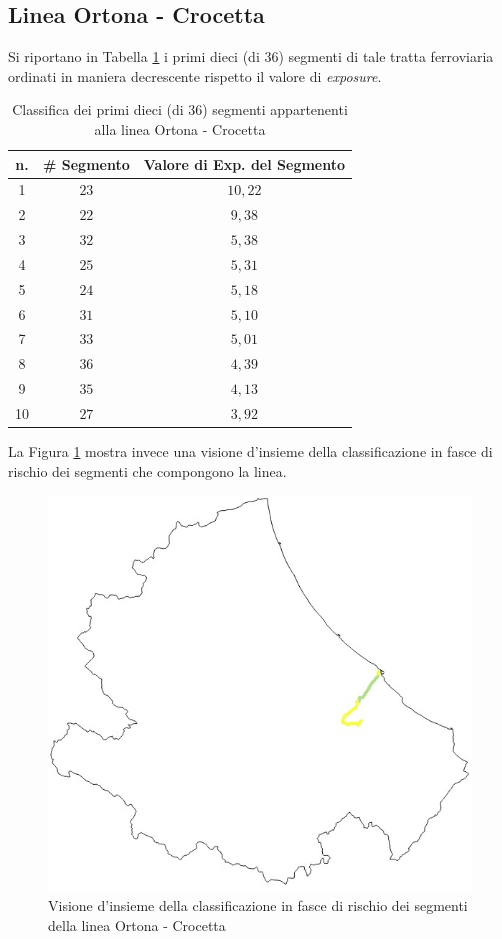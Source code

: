 \subsection{Linea Ortona - Crocetta}
Si riportano in Tabella \ref{classificaortonacrocetta} i primi dieci (di 36) segmenti di tale tratta ferroviaria ordinati in maniera decrescente rispetto il valore di \textit{exposure}.
\begin{table}[h]
\centering
\begin{tabular}{|c|c|c|}
\hline
\rowcolor{lightgray}
n. & \# Segmento & Valore di Exp. del Segmento \\ \hline \rowcolor{icterine}
1  & $23$        & $10,22$                      \\ \hline \rowcolor{icterine}
2  & $22$        & $9,38$                      \\ \hline \rowcolor{icterine}
3  & $32$        & $5,38$                      \\ \hline \rowcolor{icterine}
4  & $25$        & $5,31$                      \\ \hline \rowcolor{icterine}
5  & $24$        & $5,18$                      \\ \hline \rowcolor{icterine}
6  & $31$        & $5,10$                      \\ \hline \rowcolor{icterine}
7  & $33$       & $5,01$                      \\ \hline \rowcolor{icterine}
8  & $36$        & $4,39$                      \\ \hline \rowcolor{icterine}
9  & $35$        & $4,13$                      \\ \hline \rowcolor{icterine}
10 & $27$        & $3,92$                      \\ \hline
\end{tabular}
\caption{Classifica dei primi dieci (di 36) segmenti appartenenti alla linea Ortona - Crocetta}
\label{classificaortonacrocetta}
\end{table}
\newline
La Figura \ref{ortonacrocetta} mostra invece una visione d'insieme della classificazione in fasce di rischio dei segmenti che compongono la linea.
\begin{figure}[h]
\centering
\includegraphics[width=0.4\linewidth]{img/ortonacrocetta.jpeg}
\caption{Visione d'insieme della classificazione in fasce di rischio dei segmenti della linea Ortona - Crocetta}
\label{ortonacrocetta}
\end{figure}
